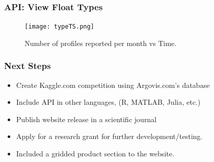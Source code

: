 \begin{frame}
\frametitle{API: View Float Types}
\begin{figure}
\centering
\begin{minipage}{1\columnwidth}
\texttt{[image: typeTS.png]}
\caption{Number of profiles reported per month vs Time.}
\end{minipage}
\end{figure}
\end{frame}

\begin{frame}
\frametitle{Next Steps}
\begin{itemize}
    \item Create Kaggle.com competition using Argovis.com's database
    \item Include API in other languages, (R, MATLAB, Julia, etc.)
    \item Publish website release in a scientific journal
    \item Apply for a research grant for further development/testing.
    \item Included a gridded product section to the website.
\end{itemize}
\end{frame}
